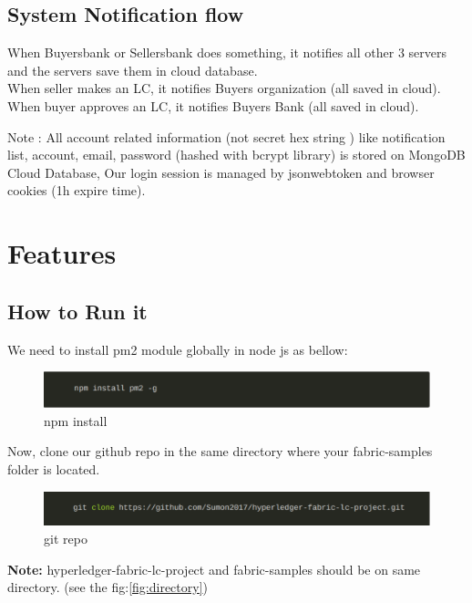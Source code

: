 \documentclass[a4paper,12pt]{report}
\begin{document}
\section{System Notification flow}
When Buyersbank or Sellersbank does something, it notifies all other 3 servers and the servers save them in cloud database.\\
When seller makes an LC, it notifies Buyers organization (all saved in cloud).\\
When buyer approves an LC, it notifies Buyers Bank (all saved in cloud).

\vspace{30pt}
{\color{magenta}Note :} All account related information (not secret hex string ) like
notification list, account, email, password (hashed with bcrypt library) is
stored on MongoDB Cloud Database, Our login session is managed by
jsonwebtoken and browser cookies (1h expire time). 

\chapter{Features}
\section{How to Run it}
We need to install pm2 module globally in node js as bellow:
\begin{figure}[h]
    \centering
    \includegraphics[width=0.7\paperwidth]{npm.pdf}
    \caption{npm install}
    \label{fig:npm}
\end{figure}


Now, clone our github repo in the same directory where your fabric-samples folder is located. \begin{figure}[h]
    \centering
    \includegraphics[width=0.7\paperwidth]{gitCapture.pdf}
    \caption{git repo}
    \label{fig:gitrepo}
\end{figure}

\newpage

\textbf{Note:} hyperledger-fabric-lc-project and fabric-samples should be on same directory. (see the fig:\ref{fig:directory})
\end{document}
